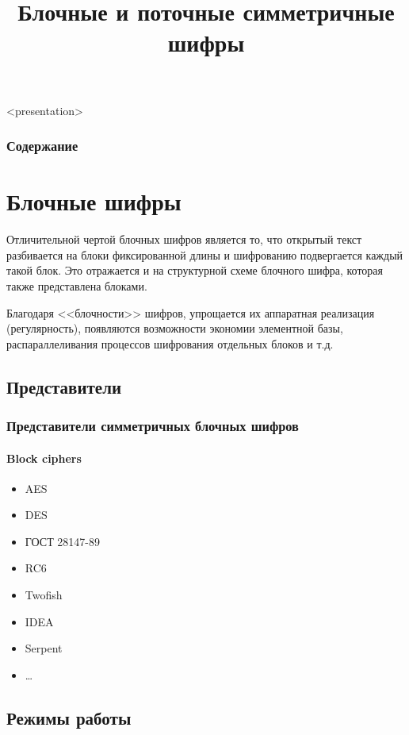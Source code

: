 
\title[Блочные и поточные шифры]{Блочные и поточные симметричные шифры}





\begin{frame}<presentation>
    \frametitle{Содержание}
    \tableofcontents
\end{frame}


\section{Блочные шифры}


Отличительной чертой блочных шифров является то, что открытый текст разбивается на блоки фиксированной длины и шифрованию подвергается каждый такой блок. Это отражается и на структурной схеме блочного шифра, которая также представлена блоками.

Благодаря <<блочности>> шифров, упрощается их аппаратная реализация (регулярность), появляются возможности экономии элементной базы, распараллеливания процессов шифрования отдельных блоков и т.д.

\subsection{Представители}


\begin{frame}
    \frametitle{Представители симметричных блочных шифров}
    \framesubtitle{Block ciphers}
    
    \begin{itemize}
        \item AES
        \item DES
        \item ГОСТ 28147-89 
        \item RC6
        \item Twofish 
        \item IDEA 
        \item Serpent
        \item \ldots
    \end{itemize} 
\end{frame}


\subsection{Режимы работы}



